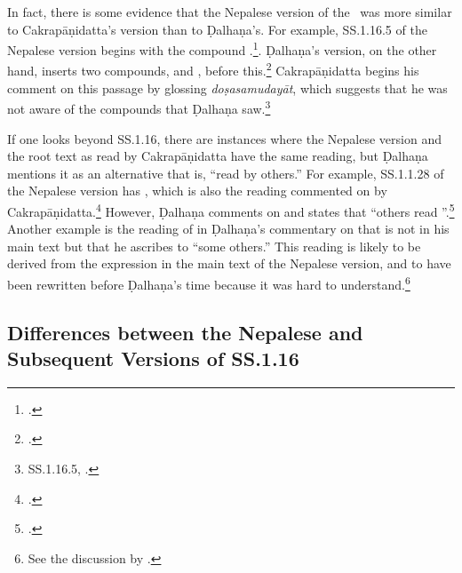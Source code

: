 In fact, there is some evidence that the Nepalese version of the \SS\ was more
similar to Cakrapāṇidatta's version than to Ḍalhaṇa's. For example, SS.1.16.5 of
the Nepalese version begins with the compound
.\footcite[126]{acar-1939}. Ḍalhaṇa's version, on the other
hand,  inserts two compounds,  and
, before this.\footnote{.} Cakrapāṇidatta
begins his comment on this passage by glossing \emph{doṣasamudayāt}, which
suggests that he was not aware of the compounds that Ḍalhaṇa
saw.\footnote{SS.1.16.5, \cite[126–127]{acar-1939}.}

If one looks beyond SS.1.16, there are instances where the Nepalese version and
the root text as read by Cakrapāṇidatta have the same reading, but Ḍalhaṇa
mentions it as an alternative that is, “read by others.” For example, SS.1.1.28 of
the Nepalese version has , which is also the reading
commented on by Cakrapāṇidatta.\footcite[17]{acar-1939} However, Ḍalhaṇa comments
on  and states that “others read ”.\footnote{.} %
Another example is the reading of  in Ḍalhaṇa's commentary
on  that is not in his main text but that he ascribes to “some
others.” This reading is likely to be derived  from the expression
 in the main text of the Nepalese version, and to have been 
rewritten before Ḍalhaṇa's time because it was hard to understand.\footnote{See
the discussion by \citet[4--5]{birc-2021a}.}


\subsection{Differences between the Nepalese and Subsequent Versions of SS.1.16}


